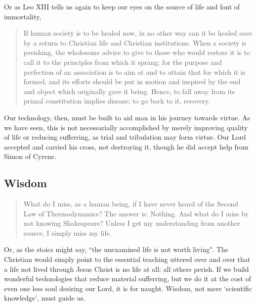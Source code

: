 \documentclass[letterpaper]{article}
\begin{document}
Or as Leo XIII tells us again to keep our eyes on the source of life and font of immortality,

\begin{quote}
  If human society is to be healed now, in no other way can it be healed save by a return to Christian life and Christian institutions. When a society is perishing, the wholesome advice to give to those who would restore it is to call it to the principles from which it sprang; for the purpose and perfection of an association is to aim at and to attain that for which it is formed, and its efforts should be put in motion and inspired by the end and object which originally gave it being. Hence, to fall away from its primal constitution implies disease; to go back to it, recovery.
\end{quote}

Our technology, then, must be built to aid man in his journey towards virtue. As we have seen, this is not necessarially accomplished by merely improving quality of life or reducing sufferring, as trial and tribulation may form virtue. Our Lord accepted and carried his cross, not destroying it, though he did accept help from Simon of Cyrene.

\subsection{Wisdom}

\begin{quote}
What do I miss, as a human being, if I have never heard of the Second Law of Thermodynamics? The answer is: Nothing. And what do I miss by not knowing Shakespeare? Unless I get my understanding from another source, I simply miss my life.
\end{quote}

Or, as the stoics might say, ``the unexamined life is not worth living". The Christian would simply point to the essential teaching uttered over and over that a life not lived through Jesus Christ is no life at all: all others perish. If we build wonderful technologies that reduce material sufferring, but we do it at the cost of even one less soul desiring our Lord, it is for naught. Wisdom, not mere `scientific knowledge', must guide us.

\iffalse
Indeed to harken back to Eden,

\begin{quote}
  Sorrow is knowledge; they who know the most
  Must mourn the deepest o'er the fatal truth,
  The Tree of Knowledge is not that of Life.
  \attrib{\textit{Manfred}, George Gordon Byron 1817}
\end{quote}
\fi
\end{document}
